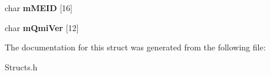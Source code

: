 \begin{DoxyCompactItemize}
\item 
\hypertarget{structsGobiUSBNet_af440cf2bb7548d51620e95e0eaf1dfce}{char {\bfseries m\-M\-E\-I\-D} \mbox{[}16\mbox{]}}\label{structsGobiUSBNet_af440cf2bb7548d51620e95e0eaf1dfce}

\item 
\hypertarget{structsGobiUSBNet_aaa347600478d886dd0b6be3f034f90f4}{char {\bfseries m\-Qmi\-Ver} \mbox{[}12\mbox{]}}\label{structsGobiUSBNet_aaa347600478d886dd0b6be3f034f90f4}

\end{DoxyCompactItemize}


\-The documentation for this struct was generated from the following file\-:\begin{DoxyCompactItemize}
\item 
\-Structs.\-h\end{DoxyCompactItemize}
